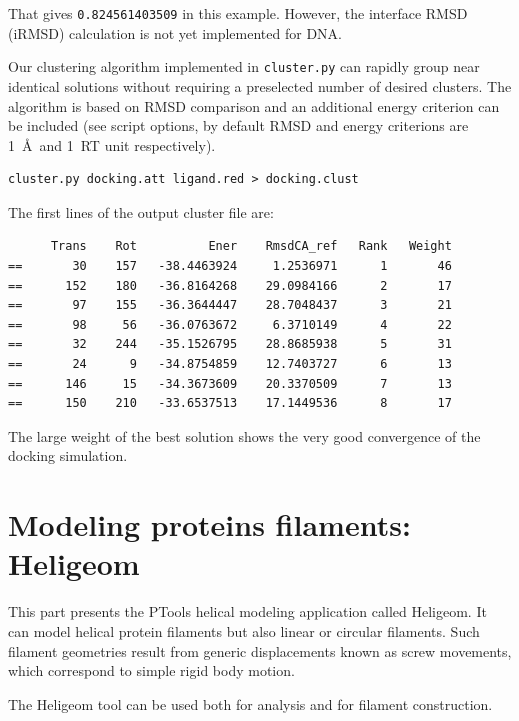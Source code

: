 \documentclass[12pt,a4paper]{article}
\begin{document}
That gives {\tt 0.824561403509} in this example. However, the interface 
RMSD (iRMSD) calculation is not yet implemented for DNA.


Our clustering algorithm implemented in {\tt cluster.py} can rapidly group
near identical solutions without requiring a preselected number of desired clusters.
The algorithm is based on RMSD comparison and an additional energy criterion can 
be included (see script options, by default RMSD and energy criterions are 
1~\AA\ and 1~RT unit respectively).

\begin{verbatim}
cluster.py docking.att ligand.red > docking.clust
\end{verbatim}

The first lines of the output cluster file are:

\linenumbers*
\begin{verbatim}
      Trans    Rot          Ener    RmsdCA_ref   Rank   Weight
==       30    157   -38.4463924     1.2536971      1       46
==      152    180   -36.8164268    29.0984166      2       17
==       97    155   -36.3644447    28.7048437      3       21
==       98     56   -36.0763672     6.3710149      4       22
==       32    244   -35.1526795    28.8685938      5       31
==       24      9   -34.8754859    12.7403727      6       13
==      146     15   -34.3673609    20.3370509      7       13
==      150    210   -33.6537513    17.1449536      8       17
\end{verbatim}
\nolinenumbers

The large weight of the best solution shows the very good convergence of the
docking simulation.



\newpage
\section{Modeling proteins filaments: Heligeom}
This part presents the PTools helical modeling application called Heligeom. It can
model helical protein filaments but also linear or circular filaments. Such filament
geometries result from generic displacements known as screw movements, which correspond to simple rigid body motion. 

The Heligeom tool can be used both for analysis and for filament construction.
\end{document}
